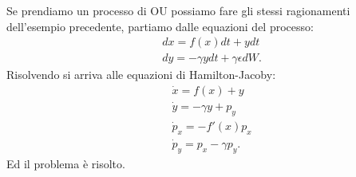 \begin{exmp}
   Se prendiamo un processo di OU possiamo fare gli stessi ragionamenti dell'esempio precedente, partiamo dalle equazioni del processo:
   \[\begin{aligned}
       & dx = f(x) dt + y dt \\
       & dy = - \gamma  y dt + \gamma\epsilon dW
   .\end{aligned}\]
   Risolvendo si arriva alle equazioni di Hamilton-Jacoby:
   \[\begin{aligned}
       & \dot{x}=f(x) + y\\
       & \dot{y}= -\gamma y + p_y\\
       & \dot{p}_x = -f'(x) p_x\\
       & \dot{p}_y=p_x - \gamma p_y
   .\end{aligned}\]
   Ed il problema è risolto.
\end{exmp}
\noindent
